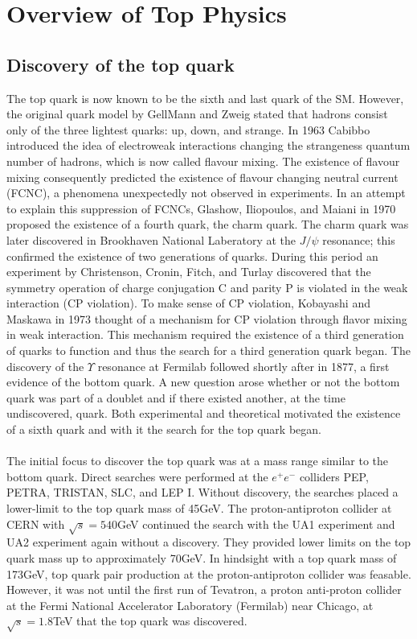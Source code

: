 \chapter{Overview of Top Physics}

\section{Discovery of the top quark}
The top quark is now known to be the sixth and last quark of the SM. However, the original quark model by GellMann\cite{GELLMANN1964214} and Zweig\cite{Zweig:570209} stated that hadrons consist only of the three lightest quarks: up, down, and strange. In 1963 Cabibbo introduced the idea of electroweak interactions changing the strangeness quantum number of hadrons, which is now called flavour mixing. The existence of flavour mixing consequently predicted the existence of flavour changing neutral current (FCNC), a phenomena unexpectedly not observed in experiments. In an attempt to explain this suppression of FCNCs, Glashow, Iliopoulos, and Maiani\cite{PhysRevD.2.1285} in 1970 proposed the existence of a fourth quark, the charm quark. The charm quark was later discovered in Brookhaven National Laberatory at the $J/\psi$ resonance; this confirmed the existence of two generations of quarks. During this period an experiment by Christenson, Cronin, Fitch, and Turlay\cite{PhysRevLett.13.138} discovered that the  symmetry operation of charge conjugation C and parity P is violated in the weak interaction (CP violation). To make sense of CP violation, Kobayashi and Maskawa in 1973 thought of a mechanism for CP violation through flavor mixing in weak interaction\cite{CKM}. This mechanism required the existence of a third generation of quarks to function and thus the search for a third generation quark began. The discovery of
the $\Upsilon$ resonance at Fermilab\cite{PhysRevLett.39.252} followed shortly after in 1877, a first evidence of the bottom quark. A new question arose whether or not the bottom quark was part of a doublet and if there existed another, at the time undiscovered, quark. Both experimental and theoretical motivated the existence of a sixth quark and with it the search for the top quark began.\\
\\
The initial focus to discover the top quark was at a mass range similar to the bottom quark. Direct searches were performed at the $e^+e^-$ colliders PEP, PETRA, TRISTAN, SLC, and LEP I. Without discovery, the searches placed a lower-limit to the top quark mass of 45GeV. The proton-antiproton collider at CERN with $\sqrt{s}= 540$GeV continued the search with the UA1 experiment and UA2 experiment again without a discovery. They provided lower limits on the top quark mass up to approximately 70GeV. In hindsight with a top quark mass of 173GeV, top quark pair production at the proton-antiproton collider was feasable. However, it was not until the first run of Tevatron, a proton anti-proton collider at the Fermi National Accelerator Laboratory (Fermilab) near Chicago, at $\sqrt{s}=1.8$TeV that the top quark was discovered\cite{RevModPhys.69.137}.